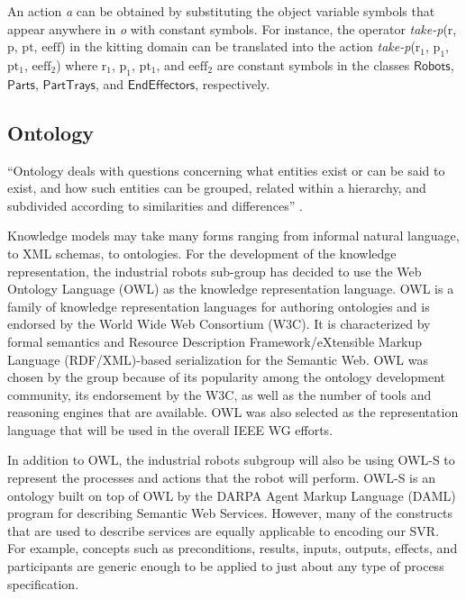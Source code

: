 \documentclass[a4paper, 10pt, conference]{ieeeconf}      %
\begin{document}
An action \textit{a} can be obtained by substituting the object variable symbols that
appear anywhere in \textit{o} with constant symbols. For instance, the operator \textsl{take-p}($\mathrm{r}$, $\mathrm{p}$, $\mathrm{pt}$, $\mathrm{eeff}$) in the kitting domain can be translated into the action \textsl{take-p}($\mathrm{r_1}$, $\mathrm{p_1}$, $\mathrm{pt_1}$, $\mathrm{eeff_2}$) where $\mathrm{r_1}$, $\mathrm{p_1}$, $\mathrm{pt_1}$, and $\mathrm{eeff_2}$ are constant symbols in the classes $\mathsf{Robots}$, $\mathsf{Parts}$, $\mathsf{PartTrays}$, and $\mathsf{EndEffectors}$, respectively.
\subsection{Ontology}
``Ontology deals with questions concerning what entities exist or can be said to exist, and how such entities can be grouped, related within a hierarchy, and subdivided according to similarities and differences'' \cite{ontologyDef}.

Knowledge models may take many forms ranging from informal natural language, to XML schemas, to ontologies.
For the development of the  knowledge representation, the industrial robots sub-group has decided to use the  Web Ontology Language (OWL) \cite{OWL} as the knowledge representation language. OWL is a family of knowledge representation languages for authoring ontologies and is endorsed by the World Wide Web Consortium (W3C). It is characterized by formal semantics and Resource Description Framework/eXtensible Markup Language (RDF/XML)-based serialization for the Semantic Web. OWL was chosen by the group because of its popularity among the ontology development community, its endorsement by the W3C, as well as the number of tools and reasoning engines that are available. OWL was also selected as the representation language that will be used in the overall IEEE WG efforts.

In addition to OWL, the industrial robots subgroup will also be using OWL-S \cite{Martin2012} to represent the processes and actions that the robot will perform. OWL-S is an ontology built on top of OWL by the DARPA Agent Markup Language (DAML) program \cite{damlWeb}
for describing Semantic Web Services. However, many of the constructs that are used to describe services are equally applicable to encoding our SVR. For example, concepts such as preconditions, results, inputs, outputs, effects, and participants are generic enough to be applied to just about any type of process specification.
\end{document}
